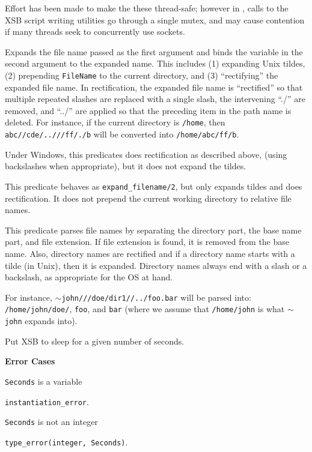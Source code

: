Effort has been made to make the these thread-safe; however in
\version, calls to the XSB script writing utilities go through a
single mutex, and may cause contention if many threads seek to
concurrently use sockets.

\begin{description}
%
Expands the file name passed as the first argument and binds the
variable in the second argument to the expanded name. This includes
(1) expanding Unix tildes, (2) prepending {\tt FileName} to the
current directory, and (3) ``rectifying'' the expanded file name.  In
rectification, the expanded file name is ``rectified'' so that
multiple repeated slashes are replaced with a single slash, the
intervening ``./'' are removed, and ``../'' are applied so that the
preceding item in the path name is deleted. For instance, if the
current directory is {\tt /home}, then {\tt abc//cde/..///ff/./b} will
be converted into {\tt /home/abc/ff/b}.

Under Windows, this predicates does rectification as described above,
(using backslashes when appropriate), but it does not expand the
tildes.

This predicate behaves as {\tt expand\_filename/2}, but only expands
tildes and does rectification. It does not prepend the current working
directory to relative file names.

This predicate parses file names by separating the directory part, the base
name part, and file extension. If file extension is found, it is removed
from the base name. Also, directory names are rectified and if a directory
name starts with a tilde (in Unix), then it is expanded. Directory names
always end with a slash or a backslash, as appropriate for the OS at hand.

For instance, {\tt $\sim$john///doe/dir1//../foo.bar} will be parsed into:
{\tt /home/john/doe/}, {\tt foo}, and {\tt bar} (where we assume that    
{\tt /home/john} is what {\tt $\sim$john} expands into).  

Put XSB to sleep for a given number of seconds.  

{\bf Error Cases}
\bi
\item 	{\tt Seconds} is a variable
\bi
\item 	{\tt instantiation\_error}.
\ei
\item 	{\tt Seconds} is not an integer
\bi
\item 	{\tt type\_error(integer, Seconds)}.
\ei
\ei


\end{description}

